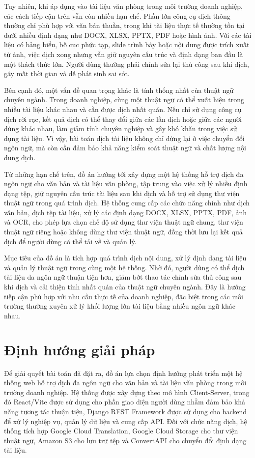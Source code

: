 \documentclass[../DoAn.tex]{subfiles}
\begin{document}
Tuy nhiên, khi áp dụng vào tài liệu văn phòng trong môi trường doanh nghiệp, các cách tiếp cận trên vẫn còn nhiều hạn chế. Phần lớn công cụ dịch thông thường chỉ phù hợp với văn bản thuần, trong khi tài liệu thực tế thường tồn tại dưới nhiều định dạng như DOCX, XLSX, PPTX, PDF hoặc hình ảnh. Với các tài liệu có bảng biểu, bố cục phức tạp, slide trình bày hoặc nội dung được trích xuất từ ảnh, việc dịch xong nhưng vẫn giữ nguyên cấu trúc và định dạng ban đầu là một thách thức lớn. Người dùng thường phải chỉnh sửa lại thủ công sau khi dịch, gây mất thời gian và dễ phát sinh sai sót.

Bên cạnh đó, một vấn đề quan trọng khác là tính thống nhất của thuật ngữ chuyên ngành. Trong doanh nghiệp, cùng một thuật ngữ có thể xuất hiện trong nhiều tài liệu khác nhau và cần được dịch nhất quán. Nếu chỉ sử dụng công cụ dịch rời rạc, kết quả dịch có thể thay đổi giữa các lần dịch hoặc giữa các người dùng khác nhau, làm giảm tính chuyên nghiệp và gây khó khăn trong việc sử dụng tài liệu. Vì vậy, bài toán dịch tài liệu không chỉ dừng lại ở việc chuyển đổi ngôn ngữ, mà còn cần đảm bảo khả năng kiểm soát thuật ngữ và chất lượng nội dung dịch.

Từ những hạn chế trên, đồ án hướng tới xây dựng một hệ thống hỗ trợ dịch đa ngôn ngữ cho văn bản và tài liệu văn phòng, tập trung vào việc xử lý nhiều định dạng tệp, giữ nguyên cấu trúc tài liệu sau khi dịch và hỗ trợ sử dụng thư viện thuật ngữ trong quá trình dịch. Hệ thống cung cấp các chức năng chính như dịch văn bản, dịch tệp tài liệu, xử lý các định dạng DOCX, XLSX, PPTX, PDF, ảnh và OCR, cho phép lựa chọn chế độ sử dụng thư viện thuật ngữ chung, thư viện thuật ngữ riêng hoặc không dùng thư viện thuật ngữ, đồng thời lưu lại kết quả dịch để người dùng có thể tải về và quản lý.

Mục tiêu của đồ án là tích hợp quá trình dịch nội dung, xử lý định dạng tài liệu và quản lý thuật ngữ trong cùng một hệ thống. Nhờ đó, người dùng có thể dịch tài liệu đa ngôn ngữ thuận tiện hơn, giảm bớt thao tác chỉnh sửa thủ công sau khi dịch và cải thiện tính nhất quán của thuật ngữ chuyên ngành. Đây là hướng tiếp cận phù hợp với nhu cầu thực tế của doanh nghiệp, đặc biệt trong các môi trường thường xuyên xử lý khối lượng lớn tài liệu bằng nhiều ngôn ngữ khác nhau.


\section{Định hướng giải pháp}
\label{section:1.3}
Để giải quyết bài toán đã đặt ra, đồ án lựa chọn định hướng phát triển một hệ thống web hỗ trợ dịch đa ngôn ngữ cho văn bản và tài liệu văn phòng trong môi trường doanh nghiệp. Hệ thống được xây dựng theo mô hình Client-Server, trong đó React/Vite được sử dụng cho phần giao diện người dùng nhằm đảm bảo khả năng tương tác thuận tiện, Django REST Framework được sử dụng cho backend để xử lý nghiệp vụ, quản lý dữ liệu và cung cấp API. Đối với chức năng dịch, hệ thống tích hợp Google Cloud Translation, Google Cloud Storage cho thư viện thuật ngữ, Amazon S3 cho lưu trữ tệp và ConvertAPI cho chuyển đổi định dạng tài liệu.
\end{document}
